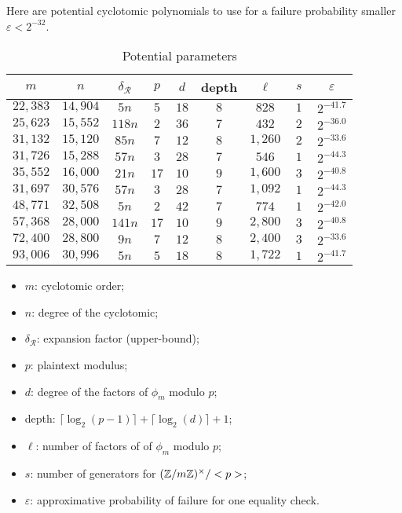 Here are potential cyclotomic polynomials to use for a failure probability smaller $\varepsilon < 2^{-32}$.

\begin{table}
  \setlength{\tabcolsep}{1em}
  \centering
  \begin{tabular}{||ccc||cccccc||}
    \hline
    $~m~$ & $~n~$ & $~\delta_\mathcal{R}~$ & $~p~$ & $~d~$ & depth & $~\ell~$ & $~s~$ & $~\varepsilon~$ \\
    \hline
    $22,383$ & $14,904$ & $5n$ & $5$  & $18$ & $8$ & $828$  & $1$ &  $2^{-41.7}$ \\
    $25,623$ & $15,552$ & $118n$ & $2$ & $36$ & $7$ & $432$ & $2$ & $2^{-36.0}$ \\
    $31,132$ & $15,120$ & $85n$ & $7$ & $12$ & $8$ & $1,260$ & $2$ & $2^{-33.6}$ \\
    $31,726$ & $15,288$ & $57n$ & $3$ & $28$ & $7$ & $546$ & $1$ & $2^{-44.3}$ \\
    $35,552$ & $16,000$ & $21n$ & $17$ & $10$ & $9$ & $1,600$ & $3$ & $2^{-40.8}$ \\
    \hline
    $31,697$ & $30,576$ & $57n$ & $3$ & $28$ & $7$ & $1,092$ & $1$ & $2^{-44.3}$ \\
    $48,771$ & $32,508$ & $5n$ & $2$ & $42$ & $7$ & $774$ & $1$ & $2^{-42.0}$ \\
    $57,368$ & $28,000$ & $141n$ & $17$ & $10$ & $9$ & $2,800$ & $3$ & $2^{-40.8}$ \\
    $72,400$ & $28,800$ & $9n$ & $7$ & $12$ & $8$ & $2,400$ & $3$ & $2^{-33.6}$ \\
    $93,006$ & $30,996$ & $5n$ & $5$ & $18$ & $8$ & $1,722$ & $1$ & $2^{-41.7}$ \\
    \hline
                                                   
  \end{tabular}
  \caption{Potential parameters}
  \label{tab:params}
\end{table}

\begin{itemize}
\item $m$: cyclotomic order;
\item $n$: degree of the cyclotomic;
\item $\delta_\mathcal{R}$: expansion factor (upper-bound);
\item $p$: plaintext modulus;
\item $d$: degree of the factors of $\phi_m$ modulo $p$;
\item depth: $\lceil \log_2(p-1) \rceil + \lceil \log_2(d)\rceil + 1$;
\item $\ell$: number of factors of of $\phi_m$ modulo $p$;
\item $s$: number of generators for $(\mathbb{Z}/m\mathbb{Z})^\times/<p>$;
\item $\varepsilon$: approximative probability of failure for one equality check.
\end{itemize}